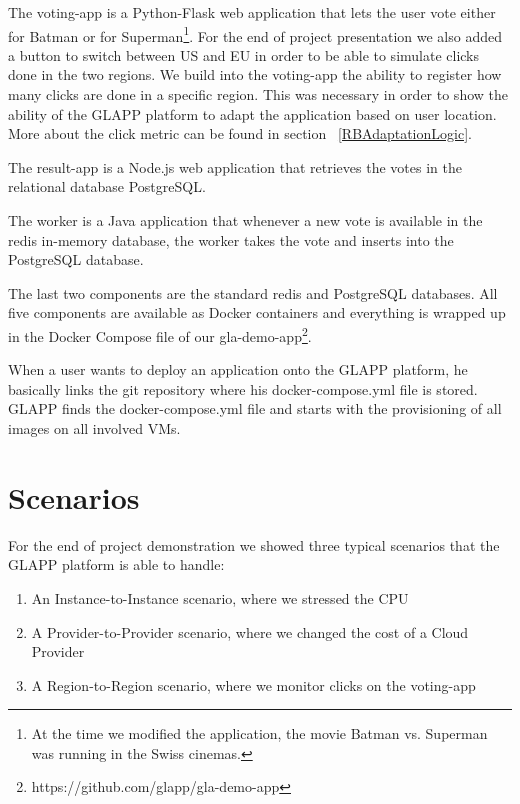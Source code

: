 \documentclass{seal_thesis}
\begin{document}
The voting-app is a Python-Flask web application that lets the user vote either for Batman or for Superman\footnote{At the time we modified the application, the movie Batman vs. Superman was running in the Swiss cinemas.}.
For the end of project presentation we also added a button to switch between US and EU in order to be able to simulate clicks done in the two regions.
We build into the voting-app the ability to register how many clicks are done in a specific region.
This was necessary in order to show the ability of the GLAPP platform to adapt the application based on user location.
More about the click metric can be found in section ~\ref{RBAdaptationLogic}.

The result-app is a Node.js web application that retrieves the votes in the relational database PostgreSQL.

The worker is a Java application that whenever a new vote is available in the redis in-memory database, the worker takes the vote and inserts into the PostgreSQL database.

The last two components are the standard redis and PostgreSQL databases.
All five components are available as Docker containers and everything is wrapped up in the Docker Compose file of our gla-demo-app\footnote{https://github.com/glapp/gla-demo-app}.

When a user wants to deploy an application onto the GLAPP platform, he basically links the git repository where his docker-compose.yml file is stored.
GLAPP finds the docker-compose.yml file and starts with the provisioning of all images on all involved VMs.

\section{Scenarios}
For the end of project demonstration we showed three typical scenarios that the GLAPP platform is able to handle:
\begin{enumerate}
	\item An Instance-to-Instance scenario, where we stressed the CPU
	\item A Provider-to-Provider scenario, where we changed the cost of a Cloud Provider
	\item A Region-to-Region scenario, where we monitor clicks on the voting-app
\end{enumerate}
\end{document}
